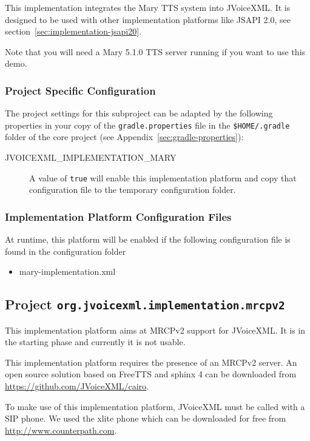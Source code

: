 \documentclass[11pt,a4paper]{article}
\begin{document}
This implementation integrates the Mary TTS system into JVoiceXML. It is
designed to be used with other implementation platforms like JSAPI 2.0, see
section~\ref{sec:implementation-jsapi20}.

Note that you will need a Mary 5.1.0  TTS server running if you want to use this
demo. 

\subsubsection{Project Specific Configuration}

The project settings for this subproject can be adapted by the following 
properties in your copy of the \texttt{gradle.properties} file in the
\texttt{\${HOME}/.gradle} folder of the core project (see 
Appendix~\ref{sec:gradle-properties}):

\begin{description}
\item[JVOICEXML\_IMPLEMENTATION\_MARY] A value of \texttt{true} will enable this implementation
platform and copy that configuration file to the temporary configuration folder.
\end{description}

\subsubsection{Implementation Platform Configuration Files}

At runtime, this platform will be enabled if the following configuration file is found in the configuration
folder
\begin{itemize}
\item mary-implementation.xml
\end{itemize}


\subsection{Project \texttt{org.jvoicexml.implementation.mrcpv2}}

This implementation platform aims at MRCPv2 support for JVoiceXML. It is in the
starting phase and currently it is not usable.

This implementation platform requires the presence of an MRCPv2 server. An open
source solution based on FreeTTS and sphinx 4 can be downloaded from
\url{https://github.com/JVoiceXML/cairo}.

To make use of this implementation platform, JVoiceXML must be called with a SIP
phone. We used the xlite phone which can be downloaded for free from
\url{http://www.counterpath.com}.
\end{document}

